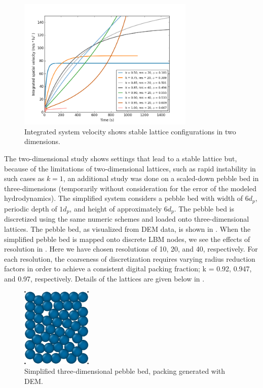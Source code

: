 \begin{figure}[ht]
    \centering
    \includegraphics[width=0.75\textwidth]{figures/lbm/2d-lbm-settings-velocity}
    \caption{Integrated system velocity shows stable lattice configurations in two dimensions.}\label{fig:2d-lbm-settings-velocity}
\end{figure}

The two-dimensional study shows settings that lead to a stable lattice but, because of the limitations of two-dimensional lattices, such as rapid instability in such cases as $k=1$, an additional study was done on a scaled-down pebble bed in three-dimensions (temporarily without consideration for the error of the modeled hydrodynamics). The simplified system considers a pebble bed with width of $6d_p$, periodic depth of $1d_p$, and height of approximately $6d_p$. The pebble bed is discretized using the same numeric schemes and loaded onto three-dimensional lattices. The pebble bed, as visualized from DEM data, is shown in . When the simplified pebble bed is mapped onto discrete LBM nodes, we see the effects of resolution in . Here we have chosen resolutions of 10, 20, and 40, respectively. For each resolution, the coarseness of discretization requires varying radius reduction factors in order to achieve a consistent digital packing fraction; k = 0.92, 0.947, and 0.97, respectively. Details of the lattices are given below in .

\begin{figure}[ht]
    \centering
    \includegraphics[width=0.3\textwidth]{figures/lbm/3d-bed}
    \caption{Simplified three-dimensional pebble bed, packing generated with DEM.}\label{fig:3d-bed-lbm}
\end{figure}

